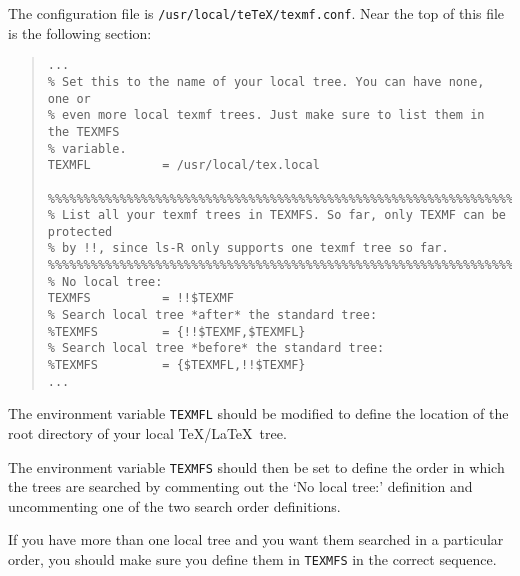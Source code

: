 \documentclass[11pt,twoside]{article}
\begin{document}
The configuration file is \texttt{/usr/local/teTeX/texmf.conf}.  Near the
top of this file is the following section:

\begin{quote}
\begin{small}
\begin{verbatim}
...
% Set this to the name of your local tree. You can have none, one or
% even more local texmf trees. Just make sure to list them in the TEXMFS
% variable.
TEXMFL          = /usr/local/tex.local

%%%%%%%%%%%%%%%%%%%%%%%%%%%%%%%%%%%%%%%%%%%%%%%%%%%%%%%%%%%%%%%%%%%%%%%%%%
% List all your texmf trees in TEXMFS. So far, only TEXMF can be protected
% by !!, since ls-R only supports one texmf tree so far.
%%%%%%%%%%%%%%%%%%%%%%%%%%%%%%%%%%%%%%%%%%%%%%%%%%%%%%%%%%%%%%%%%%%%%%%%%%
% No local tree:
TEXMFS          = !!$TEXMF
% Search local tree *after* the standard tree:
%TEXMFS         = {!!$TEXMF,$TEXMFL}
% Search local tree *before* the standard tree:
%TEXMFS         = {$TEXMFL,!!$TEXMF}
...
\end{verbatim}
\end{small}
\end{quote}

The environment variable \texttt{TEXMFL} should be modified to define the
location of the root directory of your local \TeX /\LaTeX\ tree.

The environment variable \texttt{TEXMFS} should then be set to define
the order in which the trees are searched by commenting out the `No
local tree:' definition and uncommenting one of the two search order
definitions.

If you have more than one local tree and you want them searched in a
particular order, you should make sure you define them in
\texttt{TEXMFS} in the correct sequence.
\end{document}
